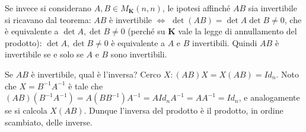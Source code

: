 \documentclass{article}
\begin{document}
Se invece si considerano $A,B\in M_{\mathbf{K}}\left( n,n\right) $, le
ipotesi affinch\'{e} $AB$ sia invertibile si ricavano dal teorema: $AB$ \`{e}
invertibile $\Longleftrightarrow $ $\det \left( AB\right) =\det A\det B\neq
0 $, che \`{e} equivalente a $\det A,\det B\neq 0$ (perch\'{e} su $\mathbf{K}
$ vale la legge di annullamento del prodotto): $\det A,\det B\neq 0$ \`{e}
equivalente a $A$ e $B$ invertibili. Quindi $AB$ \`{e} invertibile se e solo
se $A$ e $B$ sono invertibili.

Se $AB$ \`{e} invertibile, qual \`{e} l'inversa? Cerco $X:\left( AB\right)
X=X\left( AB\right) =Id_{n}$. Noto che $X=B^{-1}A^{-1}$ \`{e} tale che $%
\left( AB\right) \left( B^{-1}A^{-1}\right) =A\left( BB^{-1}\right)
A^{-1}=AId_{n}A^{-1}=AA^{-1}=Id_{n}$, e analogamente se si calcola $X\left(
AB\right) $. Dunque l'inversa del prodotto \`{e} il prodotto, in ordine
scambiato, delle inverse.
\end{document}

